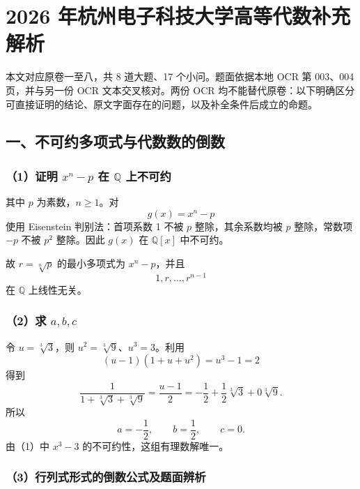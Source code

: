 \documentclass[11pt,fontset=fandol]{ctexart}
\begin{document}
\section{2026
年杭州电子科技大学高等代数补充解析}\label{ux5e74ux676dux5ddeux7535ux5b50ux79d1ux6280ux5927ux5b66ux9ad8ux7b49ux4ee3ux6570ux8865ux5145ux89e3ux6790}

本文对应原卷一至八，共 8 道大题、17 个小问。题面依据本地 OCR 第 003、004
页，并与另一份 OCR 文本交叉核对。两份 OCR
均不能替代原卷：以下明确区分可直接证明的结论、原文字面存在的问题，以及补全条件后成立的命题。

\subsection{一、不可约多项式与代数数的倒数}\label{ux4e00ux4e0dux53efux7ea6ux591aux9879ux5f0fux4e0eux4ee3ux6570ux6570ux7684ux5012ux6570}

\subsubsection{\texorpdfstring{（1）证明 \(x^n-p\) 在 \(\mathbb Q\)
上不可约}{（1）证明 x\^{}n-p 在 \textbackslash mathbb Q 上不可约}}\label{ux8bc1ux660e-xn-p-ux5728-mathbb-q-ux4e0aux4e0dux53efux7ea6}

其中 \(p\) 为素数，\(n\geq1\)。对 \[
g(x)=x^n-p
\] 使用 Eisenstein 判别法：首项系数 1 不被 \(p\) 整除，其余系数均被
\(p\) 整除，常数项 \(-p\) 不被 \(p^2\) 整除。因此 \(g(x)\) 在
\(\mathbb Q[x]\) 中不可约。

故 \(r=\sqrt[n]{p}\) 的最小多项式为 \(x^n-p\)，并且 \[
1,r,\ldots,r^{n-1}
\] 在 \(\mathbb Q\) 上线性无关。

\subsubsection{\texorpdfstring{（2）求
\(a,b,c\)}{（2）求 a,b,c}}\label{ux6c42-abc}

令 \(u=\sqrt[3]{3}\)，则 \(u^2=\sqrt[3]{9}\)、\(u^3=3\)。利用 \[
(u-1)(1+u+u^2)=u^3-1=2
\] 得到 \[
\frac1{1+\sqrt[3]{3}+\sqrt[3]{9}}
=\frac{u-1}{2}
=-\frac12+\frac12\sqrt[3]{3}+0\sqrt[3]{9}.
\] 所以 \[
\boxed{a=-\frac12,\qquad b=\frac12,\qquad c=0.}
\] 由（1）中 \(x^3-3\) 的不可约性，这组有理数解唯一。

\subsubsection{（3）行列式形式的倒数公式及题面辨析}\label{ux884cux5217ux5f0fux5f62ux5f0fux7684ux5012ux6570ux516cux5f0fux53caux9898ux9762ux8fa8ux6790}
\end{document}
